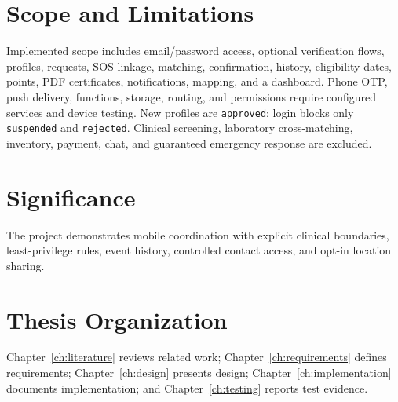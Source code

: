 \section{Scope and Limitations}
Implemented scope includes email/password access, optional verification flows, profiles, requests, SOS linkage, matching, confirmation, history, eligibility dates, points, PDF certificates, notifications, mapping, and a dashboard. Phone OTP, push delivery, functions, storage, routing, and permissions require configured services and device testing. New profiles are \texttt{approved}; login blocks only \texttt{suspended} and \texttt{rejected}. Clinical screening, laboratory cross-matching, inventory, payment, chat, and guaranteed emergency response are excluded.
\section{Significance}
The project demonstrates mobile coordination with explicit clinical boundaries, least-privilege rules, event history, controlled contact access, and opt-in location sharing.
\section{Thesis Organization}
Chapter~\ref{ch:literature} reviews related work; Chapter~\ref{ch:requirements} defines requirements; Chapter~\ref{ch:design} presents design; Chapter~\ref{ch:implementation} documents implementation; and Chapter~\ref{ch:testing} reports test evidence.

